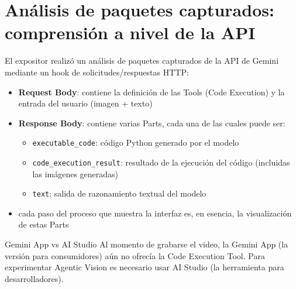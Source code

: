 \section{Análisis de paquetes capturados: comprensión a nivel de la API}

El expositor realizó un análisis de paquetes capturados de la API de Gemini mediante un hook de solicitudes/respuestas HTTP:

\begin{itemize}
    \item \textbf{Request Body}: contiene la definición de las Tools (Code Execution) y la entrada del usuario (imagen + texto)
    \item \textbf{Response Body}: contiene varias Parts, cada una de las cuales puede ser:
    \begin{itemize}
        \item \texttt{executable\_code}: código Python generado por el modelo
        \item \texttt{code\_execution\_result}: resultado de la ejecución del código (incluidas las imágenes generadas)
        \item \texttt{text}: salida de razonamiento textual del modelo
    \end{itemize}
    \item cada paso del proceso que muestra la interfaz es, en esencia, la visualización de estas Parts
\end{itemize}

\begin{knowledgebox}{Gemini App vs AI Studio}
Al momento de grabarse el video, la Gemini App (la versión para consumidores) aún no ofrecía la Code Execution Tool. Para experimentar Agentic Vision es necesario usar AI Studio (la herramienta para desarrolladores).
\end{knowledgebox}

